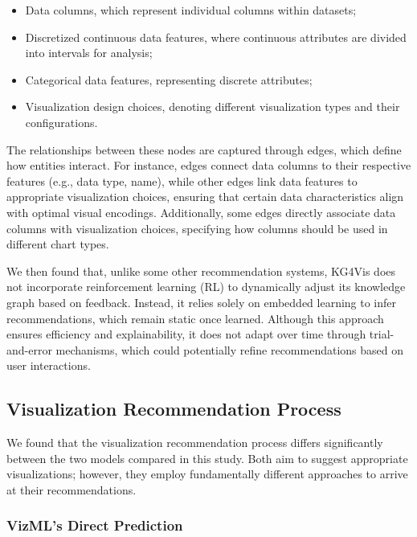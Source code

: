 \begin{itemize}

\item Data columns, which represent individual columns within datasets;

\item  Discretized continuous data features, where continuous attributes are divided into intervals for analysis;

\item Categorical data features, representing discrete attributes;

\item Visualization design choices, denoting different visualization types and their configurations.
\end{itemize}
The relationships between these nodes are captured through edges, which define how entities interact. For instance, edges connect data columns to their respective features (e.g., data type, name), while other edges link data features to appropriate visualization choices, ensuring that certain data characteristics align with optimal visual encodings. Additionally, some edges directly associate data columns with visualization choices, specifying how columns should be used in different chart types.
\medskip
\par
We then found that, unlike some other recommendation systems, KG4Vis does not incorporate reinforcement learning (RL) to dynamically adjust its knowledge graph based on feedback. Instead, it relies solely on embedded learning to infer recommendations, which remain static once learned. Although this approach ensures efficiency and explainability, it does not adapt over time through trial-and-error mechanisms, which could potentially refine recommendations based on user interactions.


\subsection{Visualization Recommendation Process}

We found that the visualization recommendation process differs significantly between the two models compared in this study. Both aim to suggest appropriate visualizations; however, they employ fundamentally different approaches to arrive at their recommendations.

\subsubsection{VizML’s Direct Prediction}

